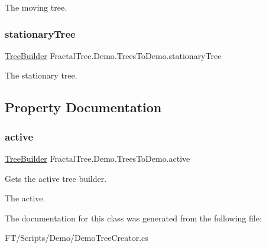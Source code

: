 The moving tree. 

\mbox{\label{class_fractal_tree_1_1_demo_1_1_trees_to_demo_aa5d13795814c54312725bbe500a0c05b}} 
\subsubsection{\texorpdfstring{stationary\+Tree}{stationaryTree}}
{\footnotesize\ttfamily \hyperlink{class_fractal_tree_1_1_tree_builder}{Tree\+Builder} Fractal\+Tree.\+Demo.\+Trees\+To\+Demo.\+stationary\+Tree}



The stationary tree. 



\subsection{Property Documentation}
\mbox{\label{class_fractal_tree_1_1_demo_1_1_trees_to_demo_a4c255b3c34a65405fd1c69a81bb9a0a0}} 
\subsubsection{\texorpdfstring{active}{active}}
{\footnotesize\ttfamily \hyperlink{class_fractal_tree_1_1_tree_builder}{Tree\+Builder} Fractal\+Tree.\+Demo.\+Trees\+To\+Demo.\+active\hspace{0.3cm}{\ttfamily [get]}}



Gets the active tree builder. 

The active.

The documentation for this class was generated from the following file\+:\begin{DoxyCompactItemize}
\item 
F\+T/\+Scripts/\+Demo/Demo\+Tree\+Creator.\+cs\end{DoxyCompactItemize}
